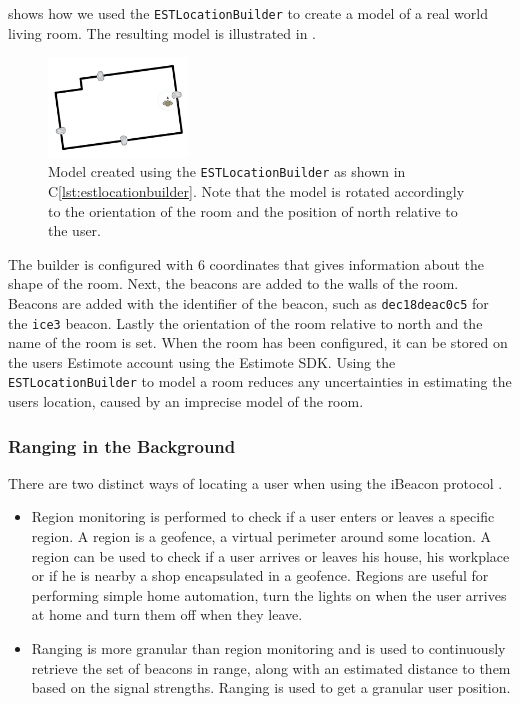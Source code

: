  shows how we used the \texttt{ESTLocationBuilder} to create a model of a real world living room. 
The resulting model is illustrated in .

\begin{figure}[!htb]
  \centering
  \includegraphics[width=0.33\textwidth]{images/living-room}
  \caption{Model created using the \texttt{ESTLocationBuilder} as shown in C\ref{lst:estlocationbuilder}. Note that the model is rotated accordingly to the orientation of the room and the position of north relative to the user.}
  \label{fig:estlocationbuilder-livingroom}
\end{figure}

The builder is configured with $6$ coordinates that gives information about the shape of the room. 
Next, the beacons are added to the walls of the room. 
Beacons are added with the identifier of the beacon, 
such as \texttt{dec18deac0c5} for the \texttt{ice3} beacon. 
Lastly the orientation of the room relative to north and the name of the room is set. 
When the room has been configured, 
it can be stored on the users Estimote account using the Estimote SDK.
Using the \texttt{ESTLocationBuilder} to model a room reduces any uncertainties in estimating the users location, 
caused by an imprecise model of the room.

\subsubsection{Ranging in the Background}

There are two distinct ways of locating a user when using the iBeacon protocol \cite{estimote:monitoring-ranging}.

\begin{itemize}
\item Region monitoring is performed to check if a user enters or leaves a specific region. A region is a geofence, \ie a virtual perimeter around some location. A region can be used to check if a user arrives or leaves his house, his workplace or if he is nearby a shop encapsulated in a geofence. Regions are useful for performing simple home automation, \eg turn the lights on when the user arrives at home and turn them off when they leave.
\item Ranging is more granular than region monitoring and is used to continuously retrieve the set of beacons in range, along with an estimated distance to them based on the signal strengths. Ranging is used to get a granular user position.
\end{itemize}

